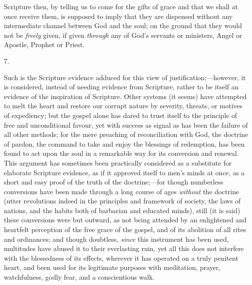 Scripture then, by telling us to come for the gifts of grace and
that we shall at once receive them, is supposed to imply that they are
dispensed without any intermediate channel between God and the soul;
on the ground that they would not be \emph{freely} given, if given \emph{through}
any of God's servants or ministers, Angel or Apostle, Prophet or
Priest.

7.

Such is the Scripture evidence adduced for this view of
justification;—however, it is considered, instead of needing
evidence from Scripture, rather to be itself an evidence of the
inspiration of Scripture. Other systems (it seems) have attempted to
melt the heart and restore our corrupt nature by severity, threats, or
motives of expediency; but the gospel alone has dared to trust itself
to the principle of free and unconditional favour, yet with success as
signal as has been the failure of all other methods; for the mere
preaching of reconciliation with God, the doctrine of pardon, the
command to take and enjoy the blessings of redemption, has been found
to act upon the soul in a remarkable way for its conversion and
renewal. This argument has sometimes been practically considered as a
substitute for elaborate Scripture evidence, as if it approved itself
to men's minds at once, as a short and easy proof of the truth of the
doctrine;—for though numberless conversions have been made through a
long course of ages \emph{without} the doctrine (utter revolutions
indeed in the principles and framework of society, the laws of
nations, and the habits both of barbarian and educated minds), still
(it is said) these conversions were but outward, as not being attended
by an enlightened and heartfelt perception of the free grace of the
gospel, and of its abolition of all rites and ordinances; and though
doubtless, \emph{since} this instrument has been used, multitudes have
abused it to their everlasting ruin, yet all this does not interfere
with the blessedness of its effects, wherever it has operated on a
truly penitent heart, and been used for its legitimate purposes with
meditation, prayer, watchfulness, godly fear, and a conscientious
walk.

